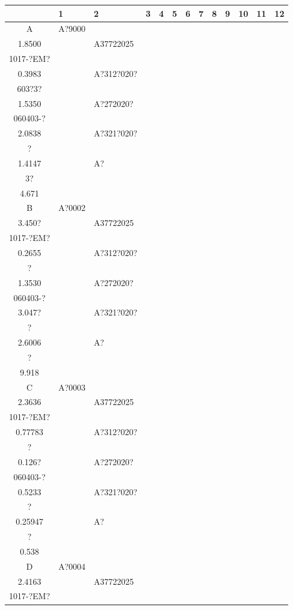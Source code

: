 \documentclass[UTF8,10pt,a4paper,fontset=fandol]{ctexart}
\begin{document}
\noindent
\begin{center}
\scriptsize
\begin{tabular}{|c|p{0.50cm}|p{0.50cm}|p{0.50cm}|p{0.50cm}|p{0.50cm}|p{0.50cm}|p{0.50cm}|p{0.50cm}|p{0.50cm}|p{0.50cm}|p{0.50cm}|p{0.50cm}|}
\hline
 & 1 & 2 & 3 & 4 & 5 & 6 & 7 & 8 & 9 & 10 & 11 & 12 \\
\hline
A &
A?9000\\
1.8500 &
&
A37722025\\
1017-?EM?\\
0.3983 &
&
A?312?020?\\
603?3?\\
1.5350 &
&
A?272020?\\
060403-?\\
2.0838 &
&
A?321?020?\\
?\\
1.4147 &
&
A?\\
3?\\
4.671 &
\\
\hline
B &
A?0002\\
3.450? &
&
A37722025\\
1017-?EM?\\
0.2655 &
&
A?312?020?\\
?\\
1.3530 &
&
A?272020?\\
060403-?\\
3.047? &
&
A?321?020?\\
?\\
2.6006 &
&
A?\\
?\\
9.918 &
\\
\hline
C &
A?0003\\
2.3636 &
&
A37722025\\
1017-?EM?\\
0.77783 &
&
A?312?020?\\
?\\
0.126? &
&
A?272020?\\
060403-?\\
0.5233 &
&
A?321?020?\\
?\\
0.25947 &
&
A?\\
?\\
0.538 &
\\
\hline
D &
A?0004\\
2.4163 &
&
A37722025\\
1017-?EM?\\

\end{tabular}
\end{center}
\end{document}
